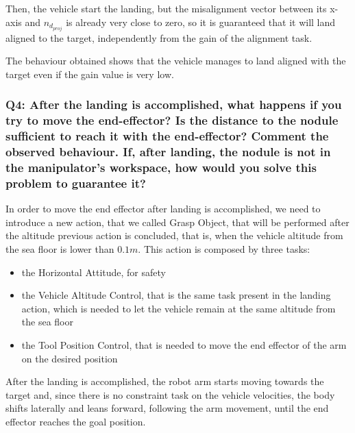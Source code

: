 \documentclass{article}
\begin{document}
Then, the vehicle start the landing, but the misalignment vector between its x-axis and \(n_{d_{proj}}\) is already very close to zero, so it is guaranteed that it will land aligned to the target, independently from the gain of the alignment task.
\begin{figure}[H]
	\centering
	\label{im:v_land_gain0_1_ind}
\end{figure} 
The behaviour obtained shows that the vehicle manages to land aligned with the target even if the gain value is very low.
 
\subsubsection{Q4: After the landing is accomplished, what happens if you try to move the end-effector? Is the distance to the nodule sufficient to reach it with the end-effector? Comment the observed behaviour. If, after landing, the nodule is not in the manipulator's workspace, how would you solve this problem to guarantee it?}

In order to move the end effector after landing is accomplished, we need to introduce a new action, that we called Grasp Object, that will be performed after the altitude previous action is concluded, that is, when the vehicle altitude from the sea floor is lower than \(0.1 m\). This action is composed by three tasks: 
\begin{itemize}
	\item the Horizontal Attitude, for safety
	\item the Vehicle Altitude Control, that is the same task present in the landing action, which is needed to let the vehicle remain at the same altitude from the sea floor
	\item the Tool Position Control, that is needed to move the end effector of the arm on the desired position
\end{itemize}
After the landing is accomplished, the robot arm starts moving towards the target and, since there is no constraint task on the vehicle velocities, the body shifts laterally and leans forward, following the arm movement, until the end effector reaches the goal position.
\end{document}
